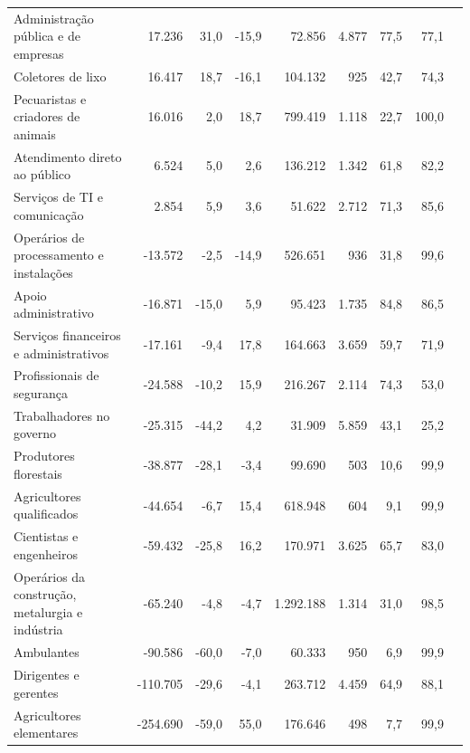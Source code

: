 \documentclass[8pt]{beamer}
\begin{document}
\begin{frame}[label=amzcod2dig]{}
\begin{table}[H]
{\begin{threeparttable}
\begin{tabular}{l*{8}{r}}
Administração pública e de empresas&      17.236&        31,0&       -15,9&      72.856&       4.877&        77,5&        77,1\\
Coletores de lixo   &      16.417&        18,7&       -16,1&     104.132&         925&        42,7&        74,3\\
Pecuaristas e criadores de animais&      16.016&         2,0&        18,7&     799.419&       1.118&        22,7&       100,0\\
Atendimento direto ao público&       6.524&         5,0&         2,6&     136.212&       1.342&        61,8&        82,2\\
Serviços de TI e comunicação&       2.854&         5,9&         3,6&      51.622&       2.712&        71,3&        85,6\\
Operários de processamento e instalações&     -13.572&        -2,5&       -14,9&     526.651&         936&        31,8&        99,6\\
Apoio administrativo&     -16.871&       -15,0&         5,9&      95.423&       1.735&        84,8&        86,5\\
Serviços financeiros e administrativos&     -17.161&        -9,4&        17,8&     164.663&       3.659&        59,7&        71,9\\
Profissionais de segurança&     -24.588&       -10,2&        15,9&     216.267&       2.114&        74,3&        53,0\\
Trabalhadores no governo&     -25.315&       -44,2&         4,2&      31.909&       5.859&        43,1&        25,2\\
Produtores florestais&     -38.877&       -28,1&        -3,4&      99.690&         503&        10,6&        99,9\\
Agricultores qualificados&     -44.654&        -6,7&        15,4&     618.948&         604&         9,1&        99,9\\
Cientistas e engenheiros&     -59.432&       -25,8&        16,2&     170.971&       3.625&        65,7&        83,0\\
Operários da construção, metalurgia e indústria&     -65.240&        -4,8&        -4,7&   1.292.188&       1.314&        31,0&        98,5\\
Ambulantes          &     -90.586&       -60,0&        -7,0&      60.333&         950&         6,9&        99,9\\
Dirigentes e gerentes&    -110.705&       -29,6&        -4,1&     263.712&       4.459&        64,9&        88,1\\
Agricultores elementares&    -254.690&       -59,0&        55,0&     176.646&         498&         7,7&        99,9\\

\end{tabular}
\end{threeparttable}}
\end{table}
\end{frame}
\end{document}
